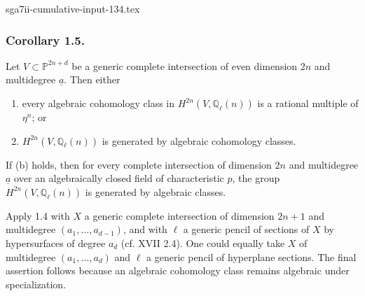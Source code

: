 \begin{filecontents*}{sga7ii-cumulative-input-134.tex}
\subsubsection*{Corollary 1.5.}
Let $V\subset\mathbb P^{2n+d}$ be a generic complete intersection of even
dimension $2n$ and multidegree $\underline a$.  Then either
\begin{enumerate}[label=(\alph*)]
\item every algebraic cohomology class in
  $H^{2n}(V,\mathbb Q_\ell(n))$ is a rational multiple of $\eta^n$; or
\item $H^{2n}(V,\mathbb Q_\ell(n))$ is generated by algebraic cohomology
  classes.
\end{enumerate}
If (b) holds, then for every complete intersection of dimension $2n$ and
multidegree $\underline a$ over an algebraically closed field of
characteristic $p$, the group $H^{2n}(V,\mathbb Q_\ell(n))$ is generated by
algebraic classes.

Apply 1.4 with $X$ a generic complete intersection of dimension $2n+1$ and
multidegree $(a_1,\ldots,a_{d-1})$, and with $\ell$ a generic pencil of
sections of $X$ by hypersurfaces of degree $a_d$ (cf. XVII 2.4).  One could
equally take $X$ of multidegree $(a_1,\ldots,a_d)$ and $\ell$ a generic
pencil of hyperplane sections.  The final assertion follows because an
algebraic cohomology class remains algebraic under specialization.

\end{filecontents*}
